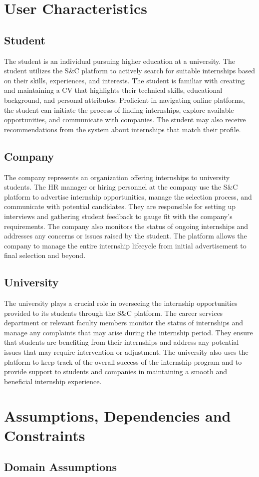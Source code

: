 \newpage
\section{User Characteristics}

\subsection{Student}
The student is an individual pursuing higher education at a university. The student utilizes the S\&C platform to actively search
for suitable internships based on their skills, experiences, and interests. The student is familiar
with creating and maintaining a CV that highlights their technical skills, educational background,
and personal attributes. Proficient in navigating online platforms, the student can initiate the
process of finding internships, explore available opportunities, and communicate with companies.
The student may also receive recommendations from the system about internships that match their profile.

\subsection{Company}
The company represents an organization offering internships to university students.
The HR manager or hiring personnel at the company use the S\&C platform to advertise
internship opportunities, manage the selection process, and communicate with potential
candidates. They are responsible for setting up interviews and gathering student feedback
to gauge fit with the company’s requirements. The company also monitors the status of
ongoing internships and addresses any concerns or issues raised by the student.
The platform allows the company to manage the entire internship lifecycle from initial
advertisement to final selection and beyond.

\subsection{University}
The university plays a crucial role in overseeing the internship opportunities provided to its
students through the S\&C platform. The career services department or relevant faculty members
monitor the status of internships and manage any complaints that may arise during the internship period.
They ensure that students are benefiting from their internships and address any potential issues
that may require intervention or adjustment. The university also uses the platform to keep track
of the overall success of the internship program and to provide support to students and companies
in maintaining a smooth and beneficial internship experience.

\newpage
\section{Assumptions, Dependencies and Constraints}
\subsection{Domain Assumptions}